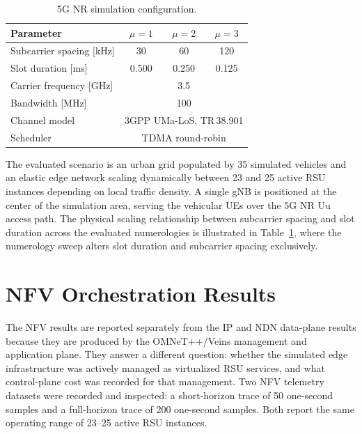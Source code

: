 \documentclass[journal]{IEEEtran}
\newcommand{\micro}{$\mu$}
\begin{document}
\begin{table}[!t]\centering
\caption{5G NR simulation configuration.}
\label{tab:nr}
\footnotesize
\begin{tabular}{@{}lccc@{}}
\toprule
Parameter & \micro$=1$ & \micro$=2$ & \micro$=3$\\
\midrule
Subcarrier spacing [kHz] & 30 & 60 & 120\\
Slot duration [ms] & 0.500 & 0.250 & 0.125\\
\midrule
Carrier frequency [GHz] & \multicolumn{3}{c}{3.5}\\
Bandwidth [MHz] & \multicolumn{3}{c}{100}\\
Channel model & \multicolumn{3}{c}{3GPP UMa-LoS, TR\,38.901}\\
Scheduler & \multicolumn{3}{c}{TDMA round-robin}\\
\bottomrule
\end{tabular}
\end{table}

The evaluated scenario is an urban grid populated by 35 simulated vehicles and an elastic edge network scaling dynamically between 23 and 25 active RSU instances depending on local traffic density. A single gNB is positioned at the center of the simulation area, serving the vehicular UEs over the 5G NR Uu access path. The physical scaling relationship between subcarrier spacing and slot duration across the evaluated numerologies is illustrated in Table~\ref{tab:nr}, where the numerology sweep alters slot duration and subcarrier spacing exclusively.


\section{NFV Orchestration Results}
\label{sec:nfv}

The NFV results are reported separately from the IP and NDN data-plane results because they are produced by the OMNeT++/Veins management and application plane. They answer a different question: whether the simulated edge infrastructure was actively managed as virtualized RSU services, and what control-plane cost was recorded for that management. Two NFV telemetry datasets were recorded and inspected: a short-horizon trace of 50 one-second samples and a full-horizon trace of 200 one-second samples. Both report the same operating range of 23--25 active RSU instances.
\end{document}

